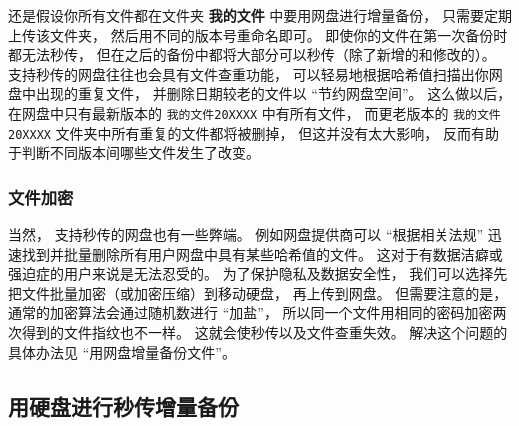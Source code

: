 还是假设你所有文件都在文件夹 \textbf{我的文件} 中要用网盘进行增量备份， 只需要定期上传该文件夹， 然后用不同的版本号重命名即可。 即使你的文件在第一次备份时都无法秒传， 但在之后的备份中都将大部分可以秒传（除了新增的和修改的）。 支持秒传的网盘往往也会具有文件查重功能， 可以轻易地根据哈希值扫描出你网盘中出现的重复文件， 并删除日期较老的文件以 “节约网盘空间”。 这么做以后， 在网盘中只有最新版本的 \verb|我的文件20XXXX| 中有所有文件， 而更老版本的 \verb|我的文件20XXXX| 文件夹中所有重复的文件都将被删掉， 但这并没有太大影响， 反而有助于判断不同版本间哪些文件发生了改变。

\subsubsection{文件加密}
当然， 支持秒传的网盘也有一些弊端。 例如网盘提供商可以 “根据相关法规” 迅速找到并批量删除所有用户网盘中具有某些哈希值的文件。 这对于有数据洁癖或强迫症的用户来说是无法忍受的。 为了保护隐私及数据安全性， 我们可以选择先把文件批量加密（或加密压缩）到移动硬盘， 再上传到网盘。 但需要注意的是， 通常的加密算法会通过随机数进行 “加盐”， 所以同一个文件用相同的密码加密两次得到的文件指纹也不一样。 这就会使秒传以及文件查重失效。 解决这个问题的具体办法见 “用网盘增量备份文件”。

\subsection{用硬盘进行秒传增量备份}
